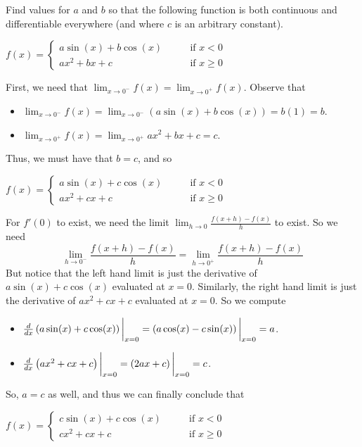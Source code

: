 \documentclass[handout,nooutcomes]{ximera}
\begin{document}
\begin{problem}
Find values for $a$ and $b$ so that the following function is both continuous and differentiable everywhere (and where $c$ is an arbitrary constant).

$f(x) =   \left\{ \begin{array}{cl}
	a \sin(x) + b \cos(x)		 	&	\qquad \text{if } x < 0					\\
	ax^2 + bx + c   				&	\qquad \text{if } x \geq 0	 \end{array} \right.  $
		\begin{freeResponse}
		First, we need that $\lim_{x \to 0^-} f(x) = \lim_{x \to 0^+} f(x)$.  Observe that
		
		\begin{itemize}
		
		\item $\lim_{x \to 0^-} f(x) 
		= \lim_{x \to 0^-} (a\sin(x) + b\cos(x))
		= b(1) = b$.
		
		\item  $ \lim_{x \to 0^+} f(x)
		= \lim_{x \to 0^+} ax^2 + bx + c 
		= c$.
		
		\end{itemize}
		
		Thus, we must have that $b = c$, and so 
		
		$f(x) =   \left\{ \begin{array}{cl}
			a \sin(x) + c \cos(x)		 	&	\qquad \text{if } x < 0					\\
			ax^2 + cx + c   				&	\qquad \text{if } x \geq 0	 \end{array} \right.  $
			
		For $f'(0)$ to exist, we need the limit $\lim_{h \to 0} \frac{f(x+h) - f(x)}{h}$ to exist.  So we need 
		$$ \lim_{h \to 0^-} \frac{f(x+h) - f(x)}{h} = \lim_{h \to 0^+} \frac{f(x+h) - f(x)}{h} $$
		But notice that the left hand limit is just the derivative of $a\sin(x) + c\cos(x)$ evaluated at $x=0$.  Similarly, the right hand limit is just the derivative of $ax^2 + cx + c$ evaluated at $x=0$.  So we compute
		
		\begin{itemize}
		
		\item $\frac{d}{dx} \left( a\sin(x) + c\cos(x) \right)\bigg|_{x=0}
			= \left( a\cos(x) - c\sin(x) \right)\bigg|_{x=0}
			= a$.
		
		\item $\frac{d}{dx} \left( ax^2 + cx + c \right)\bigg|_{x=0}
			=\left( 2ax + c \right)\bigg|_{x=0}
			= c$.
		
		\end{itemize}
		
		So, $a = c$ as well, and thus we can finally conclude that
		
		$f(x) =   \left\{ \begin{array}{cl}
			c \sin(x) + c \cos(x)		 	&	\qquad \text{if } x < 0					\\
			cx^2 + cx + c   				&	\qquad \text{if } x \geq 0	 \end{array} \right.  $
		\end{freeResponse}
		
\end{problem}
\end{document}
